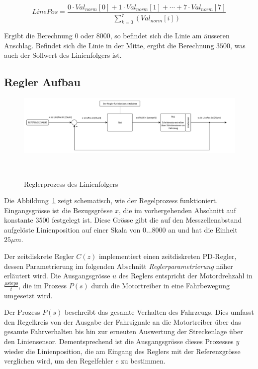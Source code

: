 \documentclass[main.tex]{subfiles} %
\begin{document}
\[
    LinePos = \frac{0 \cdot Val_{norm}[0] + 1 \cdot Val_{norm}[1] + \cdots + 7 \cdot Val_{norm}[7]}{\sum_{k=0}^{7}(Val_{norm}[i])}
\]

Ergibt die Berechnung $0$ oder $8000$, so befindet sich die Linie am äusseren
Anschlag. Befindet sich die Linie in der Mitte, ergibt die Berechnung $3500$,
was auch der Sollwert des Linienfolgers ist.

\subsection*{Regler Aufbau}

\begin{figure}[H]
    \centering
    \includegraphics[width=1.0\linewidth]{fig_Parametrierung_Linienfolgeregler/RegelProzess_Linienfolger.pdf}
    \caption{Reglerprozess des Linienfolgers}~\label{fig:Linienfolger_RegelProzess}
\end{figure}

Die Abbildung~\ref{fig:Linienfolger_RegelProzess} zeigt schematisch, wie der
Regelprozess funktioniert. Eingangsgrösse ist die Bezugsgrösse $x$, die im
vorhergehenden Abschnitt auf konstante $3500$ festgelegt ist. Diese Grösse gibt
die auf den Messzellenabstand aufgelöste Linienposition auf einer Skala von $0
    \dots 8000$ an und hat die Einheit $25\mu m$.

Der zeitdiskrete Regler $C(z)$ implementiert einen zeitdiskreten PD-Regler,
dessen Parametrierung im folgenden Abschnitt \textit{Reglerparametrierung}
näher erläutert wird. Die Ausgangsgrösse $u$ des Reglers entspricht der
Motordrehzahl in $\frac{\mu \text{steps}}{t}$, die im Prozess $P(s)$ durch die
Motortreiber in eine Fahrbewegung umgesetzt wird.

Der Prozess $P(s)$ beschreibt das gesamte Verhalten des Fahrzeugs. Dies umfasst
den Regelkreis von der Ausgabe der Fahrsignale an die Motortreiber über das
gesamte Fahrverhalten bis hin zur erneuten Auswertung der Streckenlage über den
Liniensensor. Dementsprechend ist die Ausgangsgrösse dieses Prozesses $y$
wieder die Linienposition, die am Eingang des Reglers mit der Referenzgrösse
verglichen wird, um den Regelfehler $e$ zu bestimmen.
\end{document}
